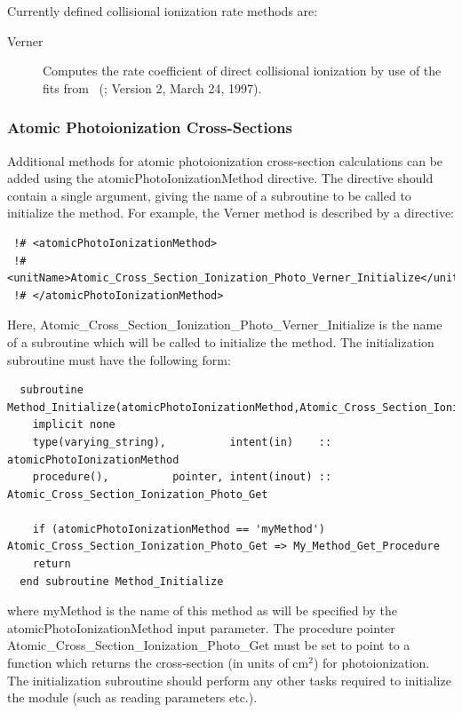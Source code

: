 Currently defined collisional ionization rate methods are:
\begin{description}
 \item [{\normalfont \ttfamily Verner}]  Computes the rate coefficient of direct collisional ionization by use of the fits from \citeauthor{voronov_practical_1997}~(\citeyear{voronov_practical_1997}; Version 2, March 24, 1997).
\end{description}

\subsubsection{Atomic Photoionization Cross-Sections}

Additional methods for atomic photoionization cross-section calculations can be added using the {\normalfont \ttfamily atomicPhotoIonizationMethod} directive. The directive should contain a single argument, giving the name of a subroutine to be called to initialize the method. For example, the {\normalfont \ttfamily Verner} method is described by a directive:
\begin{verbatim}
 !# <atomicPhotoIonizationMethod>
 !#  <unitName>Atomic_Cross_Section_Ionization_Photo_Verner_Initialize</unitName>
 !# </atomicPhotoIonizationMethod>
\end{verbatim}
Here, {\normalfont \ttfamily Atomic\_Cross\_Section\_Ionization\_Photo\_Verner\_Initialize} is the name of a subroutine which will be called to initialize the method. The initialization subroutine must have the following form:
\begin{verbatim}
  subroutine Method_Initialize(atomicPhotoIonizationMethod,Atomic_Cross_Section_Ionization_Photo_Get)
    implicit none
    type(varying_string),          intent(in)    :: atomicPhotoIonizationMethod
    procedure(),          pointer, intent(inout) :: Atomic_Cross_Section_Ionization_Photo_Get
    
    if (atomicPhotoIonizationMethod == 'myMethod') Atomic_Cross_Section_Ionization_Photo_Get => My_Method_Get_Procedure
    return
  end subroutine Method_Initialize
\end{verbatim}
where {\normalfont \ttfamily myMethod} is the name of this method as will be specified by the {\normalfont \ttfamily atomicPhotoIonizationMethod} input parameter. The procedure pointer {\normalfont \ttfamily Atomic\_Cross\_Section\_Ionization\_Photo\_Get} must be set to point to a function which returns the cross-section (in units of cm$^2$) for photoionization. The initialization subroutine should perform any other tasks required to initialize the module (such as reading parameters etc.).

